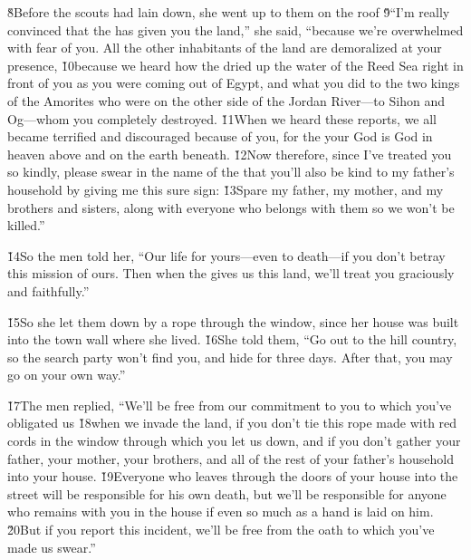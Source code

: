 \v{8}Before the scouts had lain down, she went up to them on the roof \v{9}``I'm really convinced that the  has given you the land,'' she said, ``because we're overwhelmed with fear of you. All the other inhabitants of the land are demoralized at your presence, \v{10}because we heard how the  dried up the water of the Reed Sea right in front of you as you were coming out of Egypt, and what you did to the two kings of the Amorites who were on the other side of the Jordan River---to Sihon and Og---whom you completely destroyed. \v{11}When we heard these reports, we all became terrified and discouraged because of you, for the  your God is God in heaven above and on the earth beneath. \v{12}Now therefore, since I've treated you so kindly, please swear in the name of the  that you'll also be kind to my father's household by giving me this sure sign: \v{13}Spare my father, my mother, and my brothers and sisters, along with everyone who belongs with them so we won't be killed.''

\v{14}So the men told her, ``Our life for yours---even to death---if you don't betray this mission of ours. Then when the  gives us this land, we'll treat you graciously and faithfully.''

\v{15}So she let them down by a rope through the window, since her house was built into the town wall where she lived. \v{16}She told them, ``Go out to the hill country, so the search party won't find you, and hide for three days. After that, you may go on your own way.''

\v{17}The men replied, ``We'll be free from our commitment to you to which you've obligated us \v{18}when we invade the land, if you don't tie this rope made with red cords in the window through which you let us down, and if you don't gather your father, your mother, your brothers, and all of the rest of your father's household into your house. \v{19}Everyone who leaves through the doors of your house into the street will be responsible for his own death, but we'll be responsible for anyone who remains with you in the house if even so much as a hand is laid on him. \v{20}But if you report this incident, we'll be free from the oath to which you've made us swear.''

